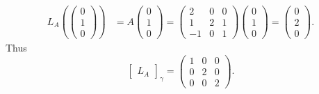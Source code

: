 \documentclass[12pt]{article}
\begin{document}
\begin{itemize}
\begin{align*}
        L_A \left( \begin{pmatrix}
        0 \\ 1 \\ 0
        \end{pmatrix} \right) &= A \begin{pmatrix}
        0 \\ 1 \\ 0
        \end{pmatrix} = \begin{pmatrix}
        2 & 0 & 0 \\ 1 & 2 & 1 \\ -1 & 0 & 1
        \end{pmatrix} \begin{pmatrix}
        0 \\ 1 \\ 0
        \end{pmatrix} = \begin{pmatrix}
        0 \\ 2 \\ 0
        \end{pmatrix}.
    \end{align*} Thus $$\begin{bmatrix}
    L_A
    \end{bmatrix}_\gamma = \begin{pmatrix}
    1 & 0 & 0 \\ 0 & 2 & 0 \\ 0 & 0 & 2
    \end{pmatrix}.$$
    

\end{itemize}
\end{document}
